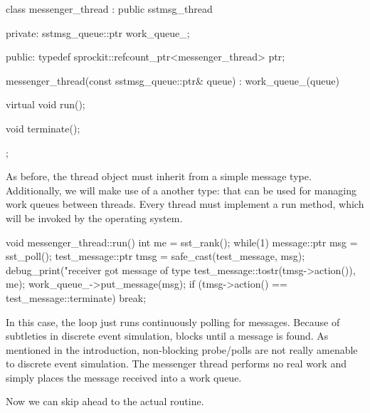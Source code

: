\begin{CppCode}
class messenger_thread :
    public sstmsg_thread
{
    private:
        sstmsg_queue::ptr work_queue_;

    public:
        typedef sprockit::refcount_ptr<messenger_thread> ptr;

        messenger_thread(const sstmsg_queue::ptr& queue)
            : work_queue_(queue)
        {
        }

        virtual void run();

        void terminate();
};
\end{CppCode}
As before, the thread object must inherit from a simple message type. 
Additionally, we will make use of a another type: 
that can be used for managing work queues between threads.
Every thread must implement a run method, which will be invoked by the \sstmacro operating system.

\begin{CppCode}
void
messenger_thread::run()
{
    int me = sst_rank();
    while(1)
    {
        message::ptr msg = sst_poll();
        test_message::ptr tmsg = safe_cast(test_message, msg);
        debug_print("receiver got message of type %
                    test_message::tostr(tmsg->action()), me);
        work_queue_->put_message(msg);
        if (tmsg->action() == test_message::terminate)
            break;
    }
}
\end{CppCode}
In this case, the loop just runs continuously polling for messages.
Because of subtleties in discrete event simulation,  blocks until a message is found.
As mentioned in the introduction, non-blocking probe/polls are not really amenable to discrete event simulation.
The messenger thread performs no real work and simply places the message received into a work queue.

Now we can skip ahead to the actual  routine.

